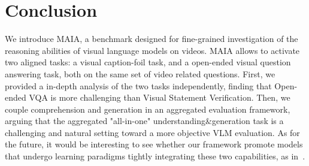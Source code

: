 

\section{Conclusion}

We introduce MAIA, a benchmark designed for fine-grained investigation of the reasoning abilities of visual language models on videos. MAIA allows to activate two aligned tasks: a visual caption-foil task, and a open-ended visual question answering task, both on the same set of video related questions.  First, we provided a in-depth analysis of the two tasks independently, finding that Open-ended VQA is more challenging than Visual Statement Verification. Then, we couple comprehension and generation in an aggregated evaluation framework, arguing that the aggregated "all-in-one" understanding\&generation task is a  challenging and natural 
setting toward a more objective VLM evaluation.  As for the future, it would be interesting  to see whether our framework promote models that undergo learning paradigms tightly integrating these two capabilities, as in~\citet{gul-artzi-2024-cogen}.





